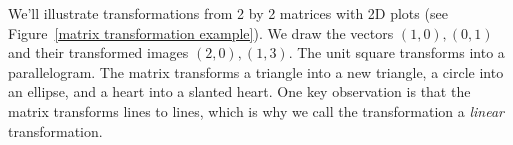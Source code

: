 We'll illustrate transformations from 2 by 2 matrices with 2D plots (see Figure~\ref{matrix transformation example}). We draw the vectors $(1,0),(0,1)$ and their transformed images $(2,0),(1,3)$.  The unit square transforms into a parallelogram. The matrix transforms a triangle into a new triangle, a circle into an ellipse, and a heart into a slanted heart. One key observation is that the matrix transforms lines to lines, which is why we call the transformation a \emph{linear} transformation.

\begin{figure}
\begin{center}
\end{center}


\end{figure}
